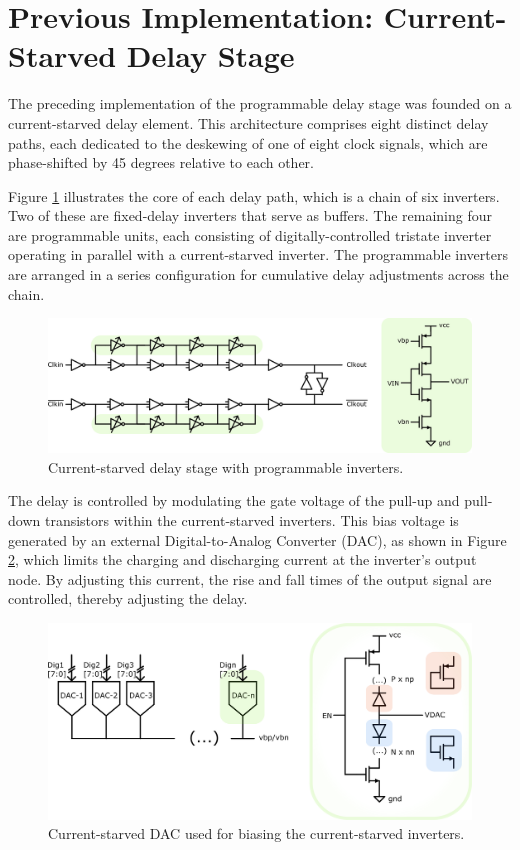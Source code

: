 

\section{Previous Implementation: Current-Starved Delay Stage}

The preceding implementation of the programmable delay stage was founded on a current-starved delay element. This architecture comprises eight distinct delay paths, each dedicated to the deskewing of one of eight clock signals, which are phase-shifted by 45 degrees relative to each other.

Figure \ref{fig:current_starved_delay_stage} illustrates the core of each delay path, which is a chain of six inverters. Two of these are fixed-delay inverters that serve as buffers. The remaining four are programmable units, each consisting of digitally-controlled tristate inverter operating in parallel with a current-starved inverter. The programmable inverters are arranged in a series configuration for cumulative delay adjustments across the chain.

\begin{figure}[H]
  \centering
  \includegraphics[width=0.8\linewidth]{figures/Schematics/old_chain.png}
  \caption{Current-starved delay stage with programmable inverters.}
  \label{fig:current_starved_delay_stage}
\end{figure}

The delay is controlled by modulating the gate voltage of the pull-up and pull-down transistors within the current-starved inverters. This bias voltage is generated by an external Digital-to-Analog Converter (DAC), as shown in Figure \ref{fig:current_starved_dac}, which limits the charging and discharging current at the inverter's output node. By adjusting this current, the rise and fall times of the output signal are controlled, thereby adjusting the delay.

\begin{figure}[H]
  \centering
  \includegraphics[width=0.8\linewidth]{figures/Schematics/old_DAC.png}
  \caption{Current-starved DAC used for biasing the current-starved inverters.}
  \label{fig:current_starved_dac}
\end{figure}

